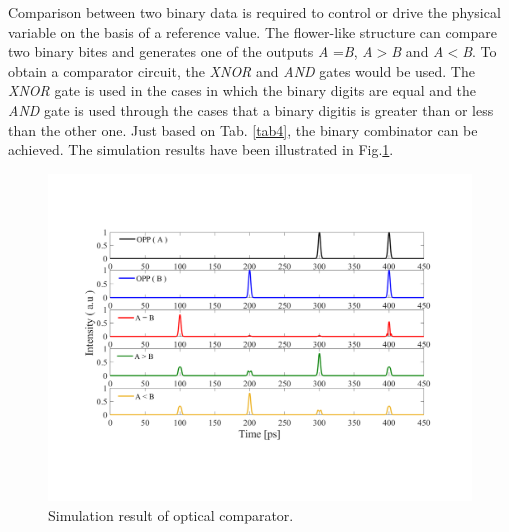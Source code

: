 \documentclass{osa-article}
\begin{document}
Comparison between two binary data is required to control or drive the physical variable on the basis of a reference value. The flower-like structure can compare two binary bites and generates one of the outputs \textit {A} =\textit {B}, \textit {A}$>$\textit {B} and \textit {A}$<$\textit {B}. To obtain a comparator circuit, the \textit{XNOR} and \textit{AND} gates would be used. The \textit{XNOR} gate is used in the cases in which the binary digits are equal and the \textit{AND} gate is used through the cases that a binary digitis is greater than or less than the other one. Just based on Tab. \ref{tab4}, the binary combinator can be achieved. The simulation results have been illustrated in Fig.\ref{fig4_comparator}.\\
\begin{figure}[tb]
\centering
\includegraphics[width=3 in]{figs/fig4_comparator.pdf}
	\caption{Simulation result of optical comparator.}
	\label{fig4_comparator}
\end{figure}
 
\end{document}
